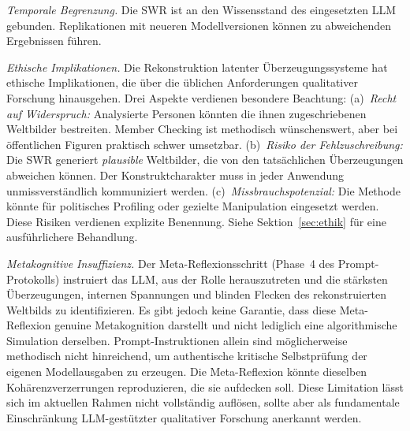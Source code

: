 \documentclass[11pt,a4paper]{article}
\theoremstyle{definition}
\theoremstyle{plain}
\theoremstyle{remark}
\begin{document}
\emph{Temporale Begrenzung.} Die SWR ist an den Wissensstand des eingesetzten LLM gebunden. Replikationen mit neueren Modellversionen k\"onnen zu abweichenden Ergebnissen f\"uhren.

\emph{Ethische Implikationen.} Die Rekonstruktion latenter \"Uberzeugungssysteme hat ethische Implikationen, die \"uber die \"ublichen Anforderungen qualitativer Forschung hinausgehen. Drei Aspekte verdienen besondere Beachtung: (a)~\emph{Recht auf Widerspruch:} Analysierte Personen k\"onnten die ihnen zugeschriebenen Weltbilder bestreiten. Member Checking ist methodisch w\"unschenswert, aber bei \"offentlichen Figuren praktisch schwer umsetzbar. (b)~\emph{Risiko der Fehlzuschreibung:} Die SWR generiert \emph{plausible} Weltbilder, die von den tats\"achlichen \"Uberzeugungen abweichen k\"onnen. Der Konstruktcharakter muss in jeder Anwendung unmissverst\"andlich kommuniziert werden. (c)~\emph{Missbrauchspotenzial:} Die Methode k\"onnte f\"ur politisches Profiling oder gezielte Manipulation eingesetzt werden. Diese Risiken verdienen explizite Benennung. Siehe Sektion~\ref{sec:ethik} f\"ur eine ausf\"uhrlichere Behandlung.

\emph{Metakognitive Insuffizienz.} Der Meta-Reflexionsschritt (Phase~4 des Prompt-Protokolls) instruiert das LLM, aus der Rolle herauszutreten und die st\"arksten \"Uberzeugungen, internen Spannungen und blinden Flecken des rekonstruierten Weltbilds zu identifizieren. Es gibt jedoch keine Garantie, dass diese Meta-Reflexion genuine Metakognition darstellt und nicht lediglich eine algorithmische Simulation derselben. Prompt-Instruktionen allein sind m\"oglicherweise methodisch nicht hinreichend, um authentische kritische Selbstpr\"ufung der eigenen Modellausgaben zu erzeugen. Die Meta-Reflexion k\"onnte dieselben Koh\"arenzverzerrungen reproduzieren, die sie aufdecken soll. Diese Limitation l\"asst sich im aktuellen Rahmen nicht vollst\"andig aufl\"osen, sollte aber als fundamentale Einschr\"ankung LLM-gest\"utzter qualitativer Forschung anerkannt werden.
\end{document}
